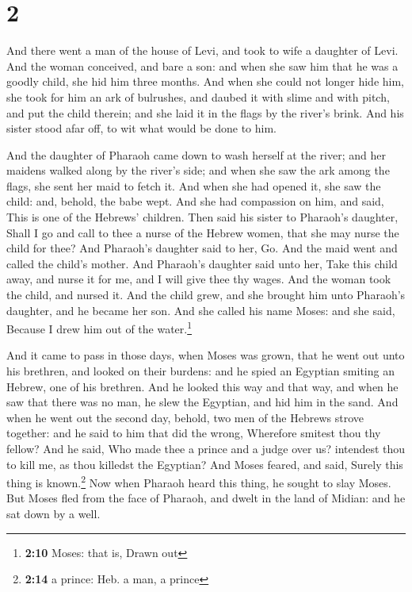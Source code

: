\hypertarget{section-1}{%
\section{2}\label{section-1}}

 And there went a man of the house of Levi, and took to
wife a daughter of Levi.  And the woman conceived, and
bare a son: and when she saw him that he was a goodly child, she hid him
three months.  And when she could not longer hide him, she
took for him an ark of bulrushes, and daubed it with slime and with
pitch, and put the child therein; and she laid it in the flags by the
river's brink.  And his sister stood afar off, to wit what
would be done to him.

 And the daughter of Pharaoh came down to wash herself at
the river; and her maidens walked along by the river's side; and when
she saw the ark among the flags, she sent her maid to fetch it.
 And when she had opened it, she saw the child: and,
behold, the babe wept. And she had compassion on him, and said, This is
one of the Hebrews' children.  Then said his sister to
Pharaoh's daughter, Shall I go and call to thee a nurse of the Hebrew
women, that she may nurse the child for thee?  And
Pharaoh's daughter said to her, Go. And the maid went and called the
child's mother.  And Pharaoh's daughter said unto her,
Take this child away, and nurse it for me, and I will give thee thy
wages. And the woman took the child, and nursed it.  And
the child grew, and she brought him unto Pharaoh's daughter, and he
became her son. And she called his name Moses: and she said, Because I
drew him out of the water.\footnote{\textbf{2:10} Moses: that is, Drawn
  out}

 And it came to pass in those days, when Moses was grown,
that he went out unto his brethren, and looked on their burdens: and he
spied an Egyptian smiting an Hebrew, one of his brethren.
 And he looked this way and that way, and when he saw
that there was no man, he slew the Egyptian, and hid him in the sand.
 And when he went out the second day, behold, two men of
the Hebrews strove together: and he said to him that did the wrong,
Wherefore smitest thou thy fellow?  And he said, Who made
thee a prince and a judge over us? intendest thou to kill me, as thou
killedst the Egyptian? And Moses feared, and said, Surely this thing is
known.\footnote{\textbf{2:14} a prince: Heb. a man, a prince}
 Now when Pharaoh heard this thing, he sought to slay
Moses. But Moses fled from the face of Pharaoh, and dwelt in the land of
Midian: and he sat down by a well.

